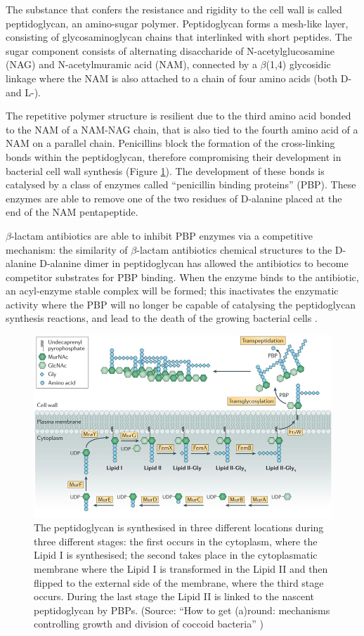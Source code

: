 \documentclass[11pt]{report}
\begin{document}
The substance that confers the resistance and rigidity to the cell wall is called peptidoglycan, an amino-sugar polymer.
Peptidoglycan forms a mesh-like layer, consisting of glycosaminoglycan chains that interlinked with short peptides.
The sugar component consists of alternating disaccharide of N-acetylglucosamine (NAG) and N-acetylmuramic acid (NAM), connected by a $\beta$(1,4) glycosidic linkage where the NAM is also attached to a chain of four amino acids (both D- and L-).

The repetitive polymer structure is resilient due to the third amino acid bonded to the NAM of a NAM-NAG chain, that is also tied to the fourth amino acid of a NAM on a parallel chain.
Penicillins block the formation of the cross-linking bonds within the peptidoglycan, therefore compromising their development in bacterial cell wall synthesis (Figure \ref{round2013}).
The development of these bonds is catalysed by a class of enzymes called ``penicillin binding proteins'' (PBP).
These enzymes are able to remove one of the two residues of D-alanine placed at the end of the NAM pentapeptide.

$\beta$-lactam antibiotics are able to inhibit PBP enzymes via a competitive mechanism: the similarity of $\beta$-lactam antibiotics chemical structures to the D-alanine D-alanine dimer in peptidoglycan has allowed the antibiotics to become competitor substrates for PBP binding.
When the enzyme binds to the antibiotic, an acyl-enzyme stable complex will be formed; this inactivates the enzymatic activity where the PBP will no longer be capable of catalysing the peptidoglycan synthesis reactions, and lead to the death of the growing bacterial cells \cite{kong2010beta}.

\clearpage
\begin{figure}[htp]
\centering
\includegraphics[scale=0.50]{img/round2013.jpg}
\caption{The peptidoglycan is synthesised in three different locations during three different stages: the first occurs in the cytoplasm, where the Lipid I is synthesised; the second takes place in the cytoplasmatic membrane where the Lipid I is transformed in the Lipid II and then flipped to the external side of the membrane, where the third stage occurs.
During the last stage the Lipid II is linked to the nascent peptidoglycan by PBPs. (Source: ``How to get (a)round: mechanisms controlling growth and division of coccoid bacteria'' \cite{round2013})}
\label{round2013}
\end{figure}
\end{document}
